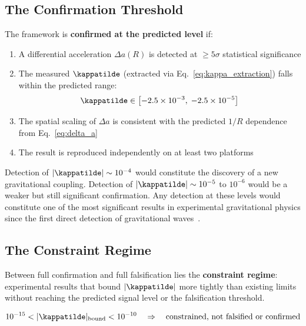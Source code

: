 \subsection{The Confirmation Threshold}
\label{subsec:confirmation}

The framework is \textbf{confirmed at the predicted level} if:

\begin{enumerate}
    \item A differential acceleration $\Delta a(R)$ is detected at
    $\geq 5\sigma$ statistical significance

    \item The measured $\kappatilde$ (extracted via
    Eq.~\eqref{eq:kappa_extraction}) falls within the predicted range:
    \begin{equation}
        \kappatilde \in \left[-2.5\times10^{-3},\;
        -2.5\times10^{-5}\right]
        \label{eq:confirmation_range}
    \end{equation}

    \item The spatial scaling of $\Delta a$ is consistent with the
    predicted $1/R$ dependence from Eq.~\eqref{eq:delta_a}

    \item The result is reproduced independently on at least two
    platforms
\end{enumerate}

\noindent Detection of $|\kappatilde| \sim 10^{-4}$ would constitute
the discovery of a new gravitational coupling. Detection of
$|\kappatilde| \sim 10^{-5}$ to $10^{-6}$ would be a weaker but
still significant confirmation. Any detection at these levels would
constitute one of the most significant results in experimental
gravitational physics since the first direct detection of gravitational
waves~\cite{ligo2016}.

\subsection{The Constraint Regime}
\label{subsec:constraints}

Between full confirmation and full falsification lies the \textbf{constraint
regime}: experimental results that bound $|\kappatilde|$ more tightly
than existing limits without reaching the predicted signal level or the
falsification threshold.

\begin{equation}
    10^{-15} < |\kappatilde|_{\mathrm{bound}} < 10^{-10}
    \quad \Rightarrow \quad \text{constrained, not falsified or confirmed}
    \label{eq:constraint_regime}
\end{equation}

